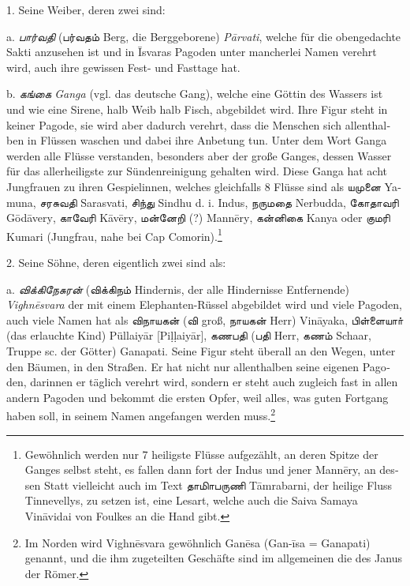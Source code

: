 \documentclass{article}
\newcommand{\TamilText}[1]{\texttamil{#1}}
\newcommand{\TamilItalic}[1]{\texttamil{\emph{#1}}}
\newcommand{\tam}[1]{\TamilText{#1}}
\newcommand{\tamitalic}[1]{\TamilItalic{#1}}
\begin{document}
{\bigskip

1. \textgerman{Seine Weiber, deren zwei sind:}

\bigskip

\textgerman{a}. \tamitalic{பார்வதி} (\tam{பர்வதம்} \textgerman{Berg, die Berggeborene}) \emph{\textgerman{P\={a}rvati}}, \textgerman{welche für die obengedachte Sakti anzusehen ist und in \={I}svaras Pagoden unter mancherlei Namen verehrt wird, auch ihre gewissen Fest- und Fasttage hat.}

\textgerman{b}. \tamitalic{கங்கை} \emph{\textgerman{Ganga}} \textgerman{(vgl. das deutsche Gang), welche eine Göttin des Wassers ist und wie eine Sirene, halb Weib halb Fisch, abgebildet wird. Ihre Figur steht in keiner Pagode, sie wird aber dadurch verehrt, dass die Menschen sich allenthalben in Flüssen waschen und dabei ihre Anbetung tun. Unter dem Wort Ganga werden alle Flüsse verstanden, besonders aber der große Ganges, dessen Wasser für das allerheiligste zur Sündenreinigung gehalten wird. Diese Ganga hat acht Jungfrauen zu ihren Gespielinnen, welches gleichfalls 8 Flüsse sind als} \tam{யமுனை} \textgerman{Yamuna}, \tam{சரசுவதி} \textgerman{Sarasvati}, \tam{சிந்து} \textgerman{Sindhu d. i. Indus}, \tam{நருமதை} \textgerman{Nerbudda}, \tam{கோதாவரி} \textgerman{G\={o}d\={a}very}, \tam{காவேரி} \textgerman{K\={a}v\={e}ry}, \tam{மன்னேறி} \textgerman{(?) Mann\={e}ry}, \tam{கன்னிகை} \textgerman{Kanya oder} \tam{குமரி} \textgerman{Kumari (Jungfrau, nahe bei Cap Comorin)}.\footnote{\textgerman{Gewöhnlich werden nur 7 heiligste Flüsse aufgezählt, an deren Spitze der Ganges selbst steht, es fallen dann fort der Indus und jener Mann\={e}ry, an dessen Statt vielleicht auch im Text} \tam{தாமிாபருணி} \textgerman{T\={a}mrabarni, der heilige Fluss Tinnevellys, zu setzen ist, eine Lesart, welche auch die Saiva Samaya Vin\={a}vidai von Foulkes an die Hand gibt.}}

\bigskip

2. \textgerman{Seine Söhne, deren eigentlich zwei sind als:}

\bigskip

\textgerman{a}. \tamitalic{விக்கிநேசுரன்} (\tam{விக்கிநம்} \textgerman{Hindernis, der alle Hindernisse Entfernende) \emph{Vighn\={e}svara} der mit einem Elephanten-Rüssel abgebildet wird und viele Pagoden, auch viele Namen hat als} \tam{விநாயகன்} (\tam{வி} \textgerman{groß}, \tam{நாயகன்} \textgerman{Herr) Vin\={a}yaka}, \tam{பிள்ளையாா்} \textgerman{(das erlauchte Kind) Püllaiy\={a}r [Piḷḷaiy\={a}r]}, \tam{கணபதி} (\tam{பதி} \textgerman{Herr}, \tam{கணம்} \textgerman{Schaar, Truppe sc. der Götter) Ganapati. Seine Figur steht überall an den Wegen, unter den Bäumen, in den Straßen. Er hat nicht nur allenthalben seine eigenen Pagoden, darinnen er täglich verehrt wird, sondern er steht auch zugleich fast in allen andern Pagoden und bekommt die ersten Opfer, weil alles, was guten Fortgang haben soll, in seinem Namen angefangen werden muss.\footnote{Im Norden wird Vighn\={e}svara gewöhnlich Gan\={e}sa (Gan-\={i}sa = Ganapati) genannt, und die ihm zugeteilten Geschäfte sind im allgemeinen die des Janus der Römer.}}

}
\end{document}
